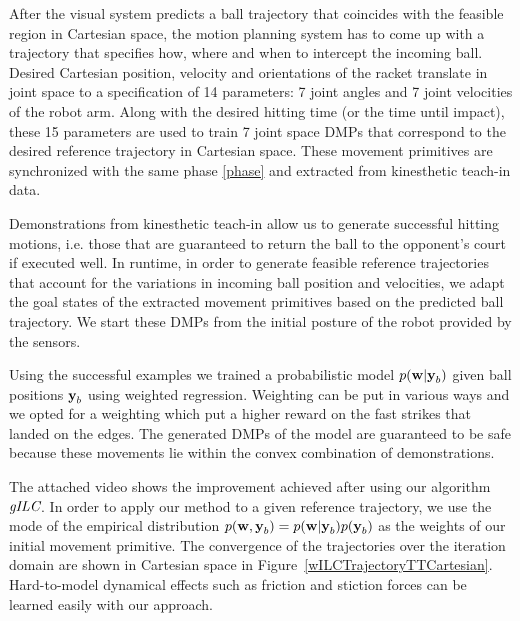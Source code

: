 After the visual system predicts a ball trajectory that coincides with the feasible region in Cartesian space, the motion planning system has to come up with a trajectory that specifies how, where and when to intercept the incoming ball. Desired Cartesian position, velocity and orientations of the racket translate in joint space to a specification of 14 parameters: 7 joint angles and 7 joint velocities of the robot arm. Along with the desired hitting time (or the time until impact), these 15 parameters are used to train 7 joint space DMPs that correspond to the desired reference trajectory in Cartesian space. These movement primitives are synchronized with the same phase \eqref{phase} and extracted from kinesthetic teach-in data.

Demonstrations from kinesthetic teach-in allow us to generate successful hitting motions, i.e. those that are guaranteed to return the ball to the opponent's court if executed well. In runtime, in order to generate feasible reference trajectories that account for the variations in incoming ball position and velocities, we adapt the goal states of the extracted movement primitives based on the predicted ball trajectory. We start these DMPs from the initial posture of the robot provided by the sensors.

Using the successful examples we trained a probabilistic model $p(\boldsymbol{\mathrm{w}}|\boldsymbol{\mathrm{y}}_b)$ given ball positions $\boldsymbol{\mathrm{y}}_b$ using weighted regression. Weighting can be put in various ways and we opted for a weighting which put a higher reward on the fast strikes that landed on the edges. The generated DMPs of the model are guaranteed to be safe because these movements lie within the convex combination of demonstrations. 



The attached video shows the improvement achieved after using our algorithm $\emph{gILC}$. In order to apply our method to a given reference trajectory, we use the mode of the empirical distribution $p(\boldsymbol{\mathrm{w}},\boldsymbol{\mathrm{y}}_b) = p(\boldsymbol{\mathrm{w}}|\boldsymbol{\mathrm{y}}_b)p(\boldsymbol{\mathrm{y}}_b)$ as the weights of our initial movement primitive. The convergence of the trajectories over the iteration domain are shown in Cartesian space in Figure~\ref{wILCTrajectoryTTCartesian}. Hard-to-model dynamical effects such as friction and stiction forces can be learned easily with our approach.

